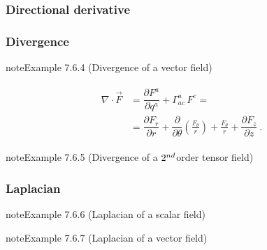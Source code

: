 \documentclass[letterpaper,10pt,english]{jupyterBook}
\begin{document}
\subsubsection{Directional derivative}
\label{\detokenize{ch/tensor-algebra-calculus/calculus-euclidean-cylindrical:directional-derivative}}\label{\detokenize{ch/tensor-algebra-calculus/calculus-euclidean-cylindrical:tensor-calculus-cylindrical-differential-operators-directional-der}}

\subsubsection{Divergence}
\label{\detokenize{ch/tensor-algebra-calculus/calculus-euclidean-cylindrical:divergence}}\label{\detokenize{ch/tensor-algebra-calculus/calculus-euclidean-cylindrical:tensor-calculus-cylindrical-differential-operators-divergence}}\label{ch/tensor-algebra-calculus/calculus-euclidean-cylindrical:example-3}
\begin{sphinxadmonition}{note}{Example 7.6.4 (Divergence of a vector field)}


\begin{equation*}
\begin{split}\begin{aligned}
  \nabla \cdot \vec{F} 
  & = \dfrac{\partial F^a}{\partial q^a} + \Gamma_{ac}^a \, F^c = \\
  & = \dfrac{\partial F_r}{\partial r} + \dfrac{\partial}{\partial \theta}\left( \frac{F_\theta}{r} \right) + \frac{F_\theta}{r} + \dfrac{\partial F_z}{\partial z} \ .
\end{aligned}\end{split}
\end{equation*}\end{sphinxadmonition}
\label{ch/tensor-algebra-calculus/calculus-euclidean-cylindrical:example-4}
\begin{sphinxadmonition}{note}{Example 7.6.5 (Divergence of a \protect\(2^{nd}\protect\)\sphinxhyphen{}order tensor field)}


\end{sphinxadmonition}


\subsubsection{Laplacian}
\label{\detokenize{ch/tensor-algebra-calculus/calculus-euclidean-cylindrical:laplacian}}\label{ch/tensor-algebra-calculus/calculus-euclidean-cylindrical:example-5}
\begin{sphinxadmonition}{note}{Example 7.6.6 (Laplacian of a scalar field)}


\end{sphinxadmonition}
\label{ch/tensor-algebra-calculus/calculus-euclidean-cylindrical:example-6}
\begin{sphinxadmonition}{note}{Example 7.6.7 (Laplacian of a vector field)}


\end{sphinxadmonition}
\end{document}
